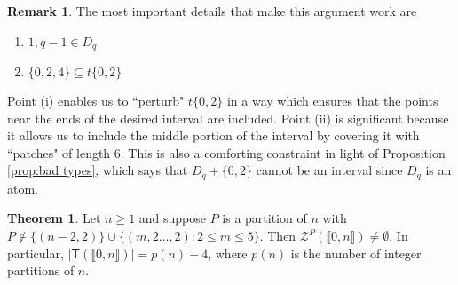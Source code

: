 \documentclass{report}
\newcommand{\Z}{\mathcal{Z}}
\newcommand{\llb}{\llbracket}
\newcommand{\rrb}{\rrbracket}
\renewcommand{\:}{\text{:}}
\theoremstyle{definition}
\newtheorem{thm}[defn]{Theorem}
\newtheorem{rk}[defn]{Remark}
\begin{document}
\begin{rk}
	The most important details that make this argument work are
	\begin{enumerate}[label={\rm (\roman{*})}]
		\item $1,q-1\in D_q$
		\item $\{0,2,4\} \subseteq t\{0,2\}$
	\end{enumerate}
	Point (i) enables us to ``perturb" $t\{0,2\}$ in a way which ensures that the points near the ends of the desired interval are included.
	Point (ii) is significant because it allows us to include the middle portion of the interval by covering it with ``patches" of length $6$.
	This is also a comforting constraint in light of Proposition \ref{prop:bad types}, which says that $D_q + \{0,2\}$ cannot be an interval since $D_q$ is an atom.
\end{rk}


\begin{thm} \label{thm:good types}
	Let $n\ge 1$ and suppose $P$ is a partition of $n$ with $P \notin \{(n-2,2)\} \cup \{ (m,2\dots,2) : 2\le m \le 5\}$.
	Then $\Z^P(\llb 0,n \rrb) \neq \emptyset$.
	In particular, $|\mathsf{T}(\llb 0,n \rrb)| = p(n)-4$, where $p(n)$ is the number of integer partitions of $n$.
\end{thm}
\end{document}
